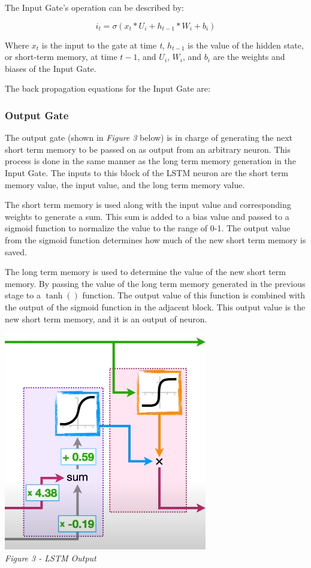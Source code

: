 \documentclass[12pt]{article}
\begin{document}
The Input Gate's operation can be described by:

\begin{equation}
    \label{eqn:i_t}
    i_t = \sigma(x_t*U_i + h_{t-1}*W_i + b_i)
\end{equation}

Where $x_t$ is the input to the gate at time \emph{t}, $h_{t-1}$ is the value
of the hidden state, or short-term memory, at time $t - 1$, and $U_i$, $W_i$,
and $b_i$ are the weights and biases of the Input Gate.

The back propagation equations for the Input Gate are:

\subsubsection{Output Gate}

The output gate (shown in \emph{Figure 3} below) is in charge of generating the
next short term memory to be passed on as output from an arbitrary neuron. This
process is done in the same manner as the long term memory generation in the
Input Gate. The inputs to this block of the LSTM neuron are the short term
memory value, the input value, and the long term memory value.

The short term memory is used along with the input value and corresponding
weights to generate a sum. This sum is added to a bias value and passed to a
sigmoid function to normalize the value to the range of 0-1. The output value
from the sigmoid function determines how much of the new short term memory is
saved.

The long term memory is used to determine the value of the new short term
memory. By passing the value of the long term memory generated in the previous
stage to a $\tanh()$ function. The output value of this function is combined
with the output of the sigmoid function in the adjacent block. This output
value is the new short term memory, and it is an output of neuron.

\begin{center}
    \includegraphics{OutputGate.png}\\
    \emph{Figure 3 - LSTM Output}
\end{center}
\end{document}

